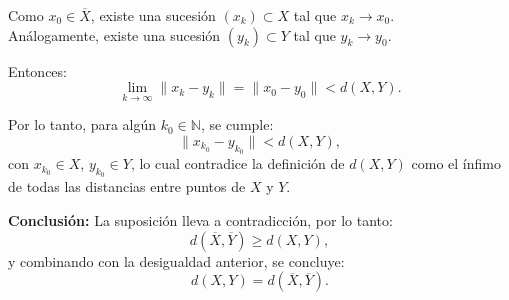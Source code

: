 {Como \( x_0 \in \overline{X} \), existe una sucesión \( (x_k) \subset X \) tal que \( x_k \to x_0 \).\\
Análogamente, existe una sucesión \( (y_k) \subset Y \) tal que \( y_k \to y_0 \).

Entonces:
\[
\lim_{k \to \infty} \|x_k - y_k\| = \|x_0 - y_0\| < d(X, Y).
\]

Por lo tanto, para algún \( k_0 \in \mathbb{N} \), se cumple:
\[
\|x_{k_0} - y_{k_0}\| < d(X, Y),
\]
con \( x_{k_0} \in X \), \( y_{k_0} \in Y \), lo cual contradice la definición de \( d(X, Y) \) como el ínfimo de todas las distancias entre puntos de \( X \) y \( Y \).

\vspace{1ex}
\textbf{Conclusión:} La suposición lleva a contradicción, por lo tanto:
\[
d(\overline{X}, \overline{Y}) \geq d(X, Y),
\]
y combinando con la desigualdad anterior, se concluye:
\[
d(X, Y) = d(\overline{X}, \overline{Y}).
\]
}

 

\thmrpf{}{}{

}{

}
 
 
 